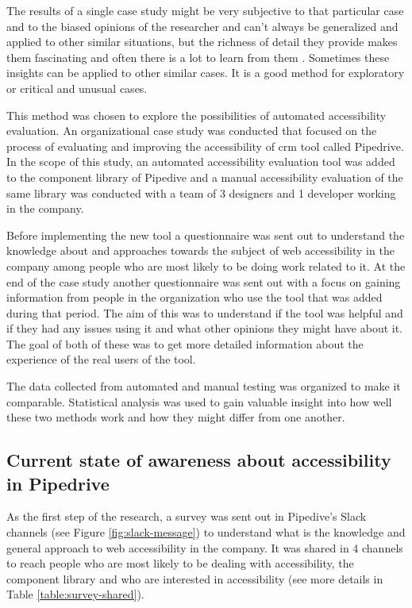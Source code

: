 \documentclass{master_thesis}
\begin{document}
The results of a single case study might be very subjective to that particular case and to the biased opinions of the researcher and can't always be generalized and applied to other similar situations, but the richness of detail they provide makes them fascinating and often there is a lot to learn from them \citep{Range2023}. Sometimes these insights can be applied to other similar cases. It is a good method for exploratory or critical and unusual cases.

This method was chosen to explore the possibilities of automated accessibility evaluation. An organizational case study was conducted that focused on the process of evaluating and improving the accessibility of \ac{crm} tool called Pipedrive. In the scope of this study, an automated accessibility evaluation tool was added to the component library of Pipedive and a manual accessibility evaluation of the same library was conducted with a team of 3 designers and 1 developer working in the company.

Before implementing the new tool a questionnaire was sent out to understand the knowledge about and approaches towards the subject of web accessibility in the company among people who are most likely to be doing work related to it. At the end of the case study another questionnaire was sent out with a focus on gaining information from people in the organization who use the tool that was added during that period. The aim of this was to understand if the tool was helpful and if they had any issues using it and what other opinions they might have about it. The goal of both of these was to get more detailed information about the experience of the real users of the tool.

The data collected from automated and manual testing was organized to make it comparable. Statistical analysis was used to gain valuable insight into how well these two methods work and how they might differ from one another.

\subsection{Current state of awareness about accessibility in Pipedrive}


As the first step of the research, a survey was sent out in Pipedive's Slack channels (see Figure \ref{fig:slack-message}) to understand what is the knowledge and general approach to web accessibility in the company. It was shared in 4 channels to reach people who are most likely to be dealing with accessibility, the component library and who are interested in accessibility (see more details in Table \ref{table:survey-shared}).
\end{document}
